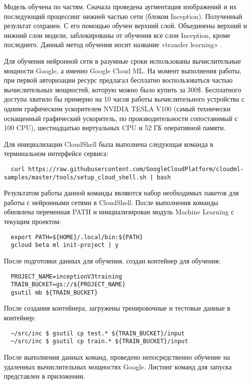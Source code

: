 Модель обучена по частям. 
Сначала проведена аугментация изображений и их последующий процессинг нижней частью сети (блоком Inception). 
Полученный результат сохранен. 
С его помощью обучен верхний слой. 
Объединены верхний и нижний слои модели, заблокированы от обучения все слои Inception, кроме последнего. 
Данный метод обучения носит название «transfer learning» \cite{transfer-learning}.

Для обучения нейронной сети в разумные сроки использованы вычислительные мощности Google, а именно Google Cloud ML. 
На момент выполнения работы, при первой авторизации ресурс предлагал бесплатно воспользоваться частью вычислительных мощностей, которую можно было купить за 300\$. 
Бесплатного доступа хватило бы примерно на 10 часов работы вычислительного устройства с одним графическим ускорителем NVIDIA TESLA V100 (самый технически оснащенный графический ускоритель, по производительности сопоставимый с 100 CPU), шестнадцатью виртуальных CPU и 52 ГБ оперативной памяти.

Для инициализации CloudShell была выполнена следующая команда в терминальном интерфейсе сервиса:
\begin{lstlisting}
  curl https://raw.githubusercontent.com/GoogleCloudPlatform/cloudml-samples/master/tools/setup_cloud_shell.sh | bash
\end{lstlisting}

Результатом работы данной команды являются набор необходимых пакетов для работы с нейронными сетями в CloudShell. 
После выполнения команды обновлена переменная PATH и инициализирован модуль Machine Learning с текущим проектом:
\begin{lstlisting}
  export PATH=${HOME}/.local/bin:${PATH}
  gcloud beta ml init-project | y
\end{lstlisting}

После подготовки данных для обучения, создан контейнер для обучения:
\begin{lstlisting}
  PROJECT_NAME=inceptionV3training
  TRAIN_BUCKET=gs://${PROJECT_NAME}
  gsutil mb ${TRAIN_BUCKET}
\end{lstlisting}


После создания контейнера, загружены тренировочные и тестовые данные в контейнер:
\begin{lstlisting}
  ~/src/inc $ gsutil cp test.* ${TRAIN_BUCKET}/input
  ~/src/inc $ gsutil cp train.* ${TRAIN_BUCKET}/input
\end{lstlisting}

После выполнения данных команд, проведено непосредственно обучение на удаленных вычислительных мощностях Google. 
Листинг команд для запуска представлен в приложении.


